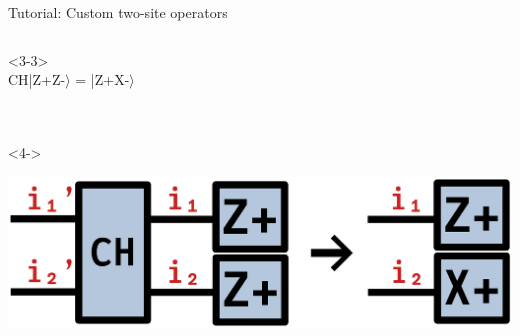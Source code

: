 \begin{frame}[fragile]{Tutorial: Custom two-site operators}
\begin{columns}
\begin{column}{4.5cm}
\begin{onlyenv}<3-3>
~\\
CH|Z+Z-$\rangle$ = |Z+X-$\rangle$ \\
~\\
~\\
\end{onlyenv}

\begin{onlyenv}<4->
\vspace*{0.0cm}
\begin{center}
\includegraphics[width=1.0\textwidth]{
  slides/assets/CHZp1Zp2_to_Zp1Xp2.png
}
\end{center}
\vspace*{0.0cm}
\end{onlyenv}

\end{column}

\end{columns}

\end{frame}
